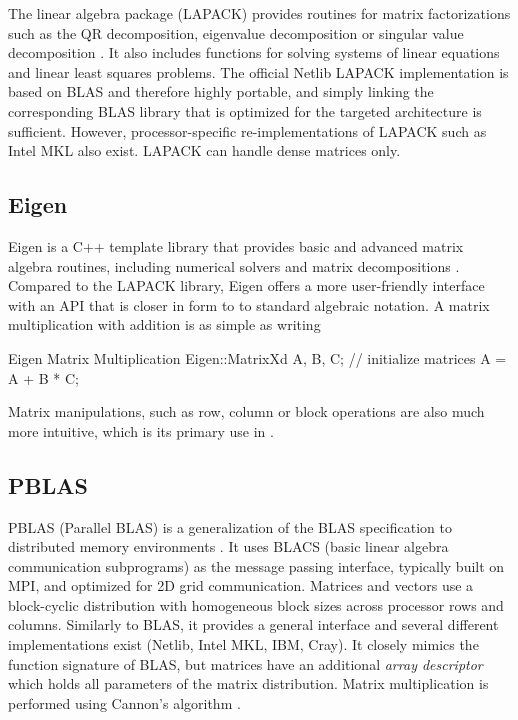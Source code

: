 The linear algebra package (LAPACK) provides routines for matrix factorizations such as the QR decomposition, eigenvalue decomposition or singular value decomposition \cite{LAP2021}. It also includes functions for solving systems of linear equations and linear least squares problems. The official Netlib LAPACK implementation is based on BLAS and therefore highly portable, and simply linking the corresponding BLAS library that is optimized for the targeted architecture is sufficient. However, processor-specific re-implementations of LAPACK such as Intel MKL also exist. LAPACK can handle dense matrices only. 

\subsection{Eigen}

Eigen is a C++ template library that provides basic and advanced matrix algebra routines, including numerical solvers and matrix decompositions \cite{Gue2010}. Compared to the LAPACK library, Eigen offers a more user-friendly interface with an API that is closer in form to to standard algebraic notation. A matrix multiplication with addition is as simple as writing
\begin{cpp}{Eigen Matrix Multiplication}
Eigen::MatrixXd A, B, C;
// initialize matrices
A = A + B * C;
\end{cpp}
\noindent Matrix manipulations, such as row, column or block operations are also much more intuitive, which is its primary use in \mchem{}.

\subsection{PBLAS}

PBLAS (Parallel BLAS) is a generalization of the BLAS specification to distributed memory environments \cite{PBLAS2021}. It uses BLACS (basic linear algebra communication subprograms) as the message passing interface, typically built on MPI, and optimized for 2D grid communication. Matrices and vectors use a block-cyclic distribution with homogeneous block sizes across processor rows and columns. Similarly to BLAS, it provides a general interface and several different implementations exist (Netlib, Intel MKL, IBM, Cray). It closely mimics the function signature of BLAS, but matrices have an additional \emph{array descriptor} which holds all parameters of the matrix distribution. Matrix multiplication is performed using Cannon's algorithm \cite{Can1969}.

